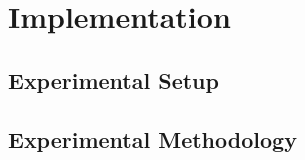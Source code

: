 \section{Implementation} \label{sec:implementation}

\subsection{Experimental Setup}


\subsection{Experimental Methodology}

